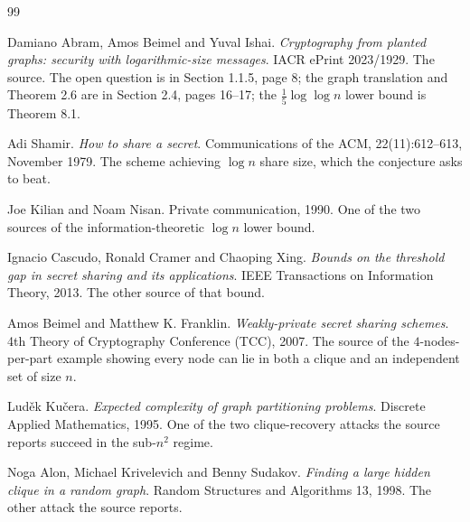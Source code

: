 \documentclass{aicr-conjecture}
\begin{document}
\begin{aicrbibliography}{99}

Damiano Abram, Amos Beimel and Yuval Ishai.
\emph{Cryptography from planted graphs: security with logarithmic-size
messages}.
IACR ePrint 2023/1929.
The source. The open question is in Section 1.1.5, page 8; the graph
translation and Theorem 2.6 are in Section 2.4, pages 16--17; the
$\frac{1}{5}\log\log n$ lower bound is Theorem 8.1.

Adi Shamir.
\emph{How to share a secret}.
Communications of the ACM, 22(11):612--613, November 1979.
The scheme achieving $\log n$ share size, which the conjecture asks to
beat.

Joe Kilian and Noam Nisan.
Private communication, 1990.
One of the two sources of the information-theoretic $\log n$ lower bound.

Ignacio Cascudo, Ronald Cramer and Chaoping Xing.
\emph{Bounds on the threshold gap in secret sharing and its
applications}.
IEEE Transactions on Information Theory, 2013.
The other source of that bound.

Amos Beimel and Matthew K. Franklin.
\emph{Weakly-private secret sharing schemes}.
4th Theory of Cryptography Conference (TCC), 2007.
The source of the $4$-nodes-per-part example showing every node can lie in
both a clique and an independent set of size $n$.

Lud\v{e}k Ku\v{c}era.
\emph{Expected complexity of graph partitioning problems}.
Discrete Applied Mathematics, 1995.
One of the two clique-recovery attacks the source reports succeed in the
sub-$n^{2}$ regime.

Noga Alon, Michael Krivelevich and Benny Sudakov.
\emph{Finding a large hidden clique in a random graph}.
Random Structures and Algorithms 13, 1998.
The other attack the source reports.

\end{aicrbibliography}
\end{document}
